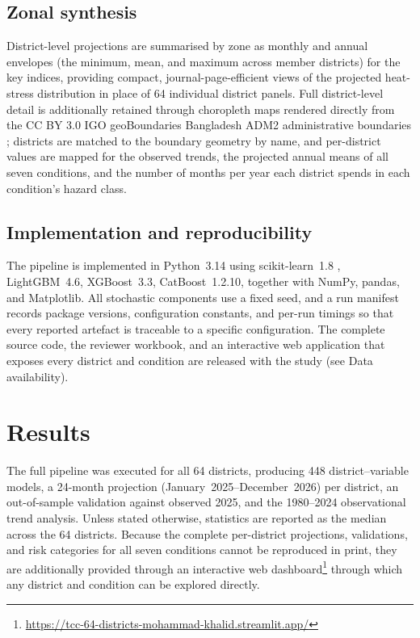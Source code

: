 \documentclass[review,11pt]{elsarticle}
\begin{document}
\subsection{Zonal synthesis}\label{sec:zonal}
District-level projections are summarised by zone as monthly and annual
envelopes (the minimum, mean, and maximum across member districts) for the key
indices, providing compact, journal-page-efficient views of the projected
heat-stress distribution in place of 64 individual district panels. Full
district-level detail is additionally retained through choropleth maps rendered
directly from the CC BY 3.0 IGO geoBoundaries Bangladesh ADM2 administrative
boundaries \citep{GeoBoundaries2020}; districts are matched to the boundary geometry
by name, and per-district values are mapped for the observed trends, the projected
annual means of all seven conditions, and the number of months per year each
district spends in each condition's hazard class.

\subsection{Implementation and reproducibility}\label{sec:impl}
The pipeline is implemented in Python~3.14 using scikit-learn~1.8
\citep{Pedregosa2011}, LightGBM~4.6, XGBoost~3.3, CatBoost~1.2.10, together with
NumPy, pandas, and Matplotlib. All stochastic components use a fixed seed, and a
run manifest records package versions, configuration constants, and per-run
timings so that every reported artefact is traceable to a specific
configuration. The complete source code, the reviewer workbook, and an
interactive web application that exposes every district and condition are
released with the study (see Data availability).

\section{Results}\label{sec:results}

The full pipeline was executed for all 64 districts, producing 448
district--variable models, a 24-month projection (January~2025--December~2026)
per district, an out-of-sample validation against observed 2025, and the
1980--2024 observational trend analysis. Unless stated otherwise, statistics are
reported as the median across the 64 districts. Because the complete per-district
projections, validations, and risk categories for all seven conditions cannot be
reproduced in print, they are additionally provided through an interactive web
dashboard\footnote{\url{https://tcc-64-districts-mohammad-khalid.streamlit.app/}}
through which any district and condition can be explored directly.
\end{document}
